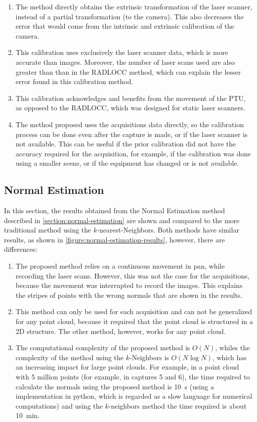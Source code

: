 \begin{enumerate}
    \item The method directly obtains the extrinsic transformation of the laser scanner, instead of a partial transformation (to the camera). This also decreases the error that would come from the intrinsic and extrinsic calibration of the camera.
    \item This calibration uses exclusively the laser scanner data, which is more accurate than images. Moreover, the number of laser scans used are also greater than than in the RADLOCC method, which can explain the lesser error found in this calibration method.
    \item This calibration acknowledges and benefits from the movement of the PTU, as opposed to the RADLOCC, which was designed for static laser scanners.
    \item The method proposed uses the acquisitions data directly, so the calibration process can be done even after the capture is made, or if the laser scanner is not available. This can be useful if the prior calibration did not have the accuracy required for the acquisition, for example, if the calibration was done using a smaller scene, or if the equipment has changed or is not available.
\end{enumerate}

\subsection{Normal Estimation}
\label{section:results-normal-estimation}

In this section, the results obtained from the Normal Estimation method described in \cref{section:normal-estimation} are shown and compared to the more traditional method using the $k$-nearest-Neighbors. Both methods have similar results, as shown in \cref{figure:normal-estimation-results}, however, there are differences:

\begin{enumerate}
    \item The proposed method relies on a continuous movement in pan, while recording the laser scans. However, this was not the case for the acquisitions, because the movement was interrupted to record the images. This explains the stripes of points with the wrong normals that are shown in the results.
    \item This method can only be used for each acquisition and can not be generalized for any point cloud, because it required that the point cloud is structured in a 2D structure. The other method, however, works for any point cloud.
    \item The computational complexity of the proposed method is $O(N)$, whiles the complexity of the method using the $k$-Neighbors is $O(N \log N)$, which has an increasing impact for large point clouds. For example, in a point cloud with 5 million points (for example, in captures 5 and 6), the time required to calculate the normals using the proposed method is \SI{10}{\second} (using a implementation in python, which is regarded as a slow language for numerical computations) and using the $k$-neighbors method the time required is about \SI{10}{\minute}.
\end{enumerate}

